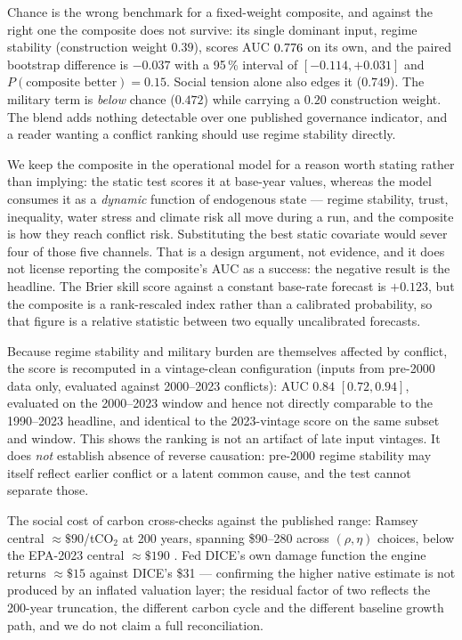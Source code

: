 \documentclass[12pt,a4paper]{article}
\newcommand{\aucPaired}{-0.037}   \newcommand{\aucMil}{0.472}
\begin{document}
Chance is the wrong benchmark for a fixed-weight composite, and against the right one the
composite does not survive: its single dominant input, regime stability (construction weight
$0.39$), scores AUC $0.776$ on its own, and the paired bootstrap difference is
$\aucPaired$ with a 95\,\% interval of $[-0.114,+0.031]$ and $P(\text{composite better}) =
0.15$. Social tension alone also edges it ($0.749$). The military term is \emph{below} chance
($\aucMil$) while carrying a $0.20$ construction weight. The blend adds nothing detectable
over one published governance indicator, and a reader wanting a conflict ranking should use
regime stability directly.

We keep the composite in the operational model for a reason worth stating rather than implying:
the static test scores it at base-year values, whereas the model consumes it as a
\emph{dynamic} function of endogenous state --- regime stability, trust, inequality, water
stress and climate risk all move during a run, and the composite is how they reach conflict
risk. Substituting the best static covariate would sever four of those five channels. That is a
design argument, not evidence, and it does not license reporting the composite's AUC as a
success: the negative result is the headline. The Brier skill score against a constant
base-rate forecast is $+0.123$, but the composite is a rank-rescaled index rather than a
calibrated probability, so that figure is a relative statistic between two equally uncalibrated
forecasts.

Because regime stability and military burden are themselves affected by conflict, the score is
recomputed in a vintage-clean configuration (inputs from pre-2000 data only, evaluated against
2000--2023 conflicts): AUC $0.84$ $[0.72,0.94]$, evaluated on the 2000--2023 window and hence
not directly comparable to the 1990--2023 headline, and identical to the 2023-vintage score on
the same subset and window. This shows the ranking is not an artifact of late input vintages.
It does \emph{not} establish absence of reverse causation: pre-2000 regime stability may
itself reflect earlier conflict or a latent common cause, and the test cannot separate those.

The social cost of carbon cross-checks against the published range: Ramsey central
${\approx}\$90$/tCO$_2$ at 200 years, spanning \$90--280 across $(\rho,\eta)$ choices, below
the EPA-2023 central ${\approx}\$190$ \citep{epa2023,rennert2022}. Fed DICE's own damage
function the engine returns ${\approx}\$15$ against DICE's \$31 \citep{nordhaus2018} ---
confirming the higher native estimate is not produced by an inflated valuation layer; the
residual factor of two reflects the 200-year truncation, the different carbon cycle and the
different baseline growth path, and we do not claim a full reconciliation.
\end{document}

